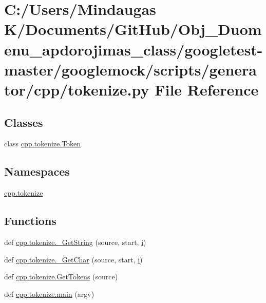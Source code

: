 \hypertarget{googletest-master_2googlemock_2scripts_2generator_2cpp_2tokenize_8py}{}\section{C\+:/\+Users/\+Mindaugas K/\+Documents/\+Git\+Hub/\+Obj\+\_\+\+Duomenu\+\_\+apdorojimas\+\_\+class/googletest-\/master/googlemock/scripts/generator/cpp/tokenize.py File Reference}
\label{googletest-master_2googlemock_2scripts_2generator_2cpp_2tokenize_8py}
\subsection*{Classes}
\begin{DoxyCompactItemize}
\item 
class \mbox{\hyperlink{classcpp_1_1tokenize_1_1_token}{cpp.\+tokenize.\+Token}}
\end{DoxyCompactItemize}
\subsection*{Namespaces}
\begin{DoxyCompactItemize}
\item 
 \mbox{\hyperlink{namespacecpp_1_1tokenize}{cpp.\+tokenize}}
\end{DoxyCompactItemize}
\subsection*{Functions}
\begin{DoxyCompactItemize}
\item 
def \mbox{\hyperlink{namespacecpp_1_1tokenize_a3c6a8b154110b4b6a0385ccc3469db77}{cpp.\+tokenize.\+\_\+\+Get\+String}} (source, start, \mbox{\hyperlink{_obj__test_2lib_2googletest-master_2googlemock_2test_2gmock-matchers__test_8cc_acb559820d9ca11295b4500f179ef6392}{i}})
\item 
def \mbox{\hyperlink{namespacecpp_1_1tokenize_abeb75f493bd3035922daf150f5213ba9}{cpp.\+tokenize.\+\_\+\+Get\+Char}} (source, start, \mbox{\hyperlink{_obj__test_2lib_2googletest-master_2googlemock_2test_2gmock-matchers__test_8cc_acb559820d9ca11295b4500f179ef6392}{i}})
\item 
def \mbox{\hyperlink{namespacecpp_1_1tokenize_ab78959b4d0a9c3bade98904a23129afc}{cpp.\+tokenize.\+Get\+Tokens}} (source)
\item 
def \mbox{\hyperlink{namespacecpp_1_1tokenize_ae666c331b4bd7d1f3e8956c78cc6f3a4}{cpp.\+tokenize.\+main}} (argv)
\end{DoxyCompactItemize}
